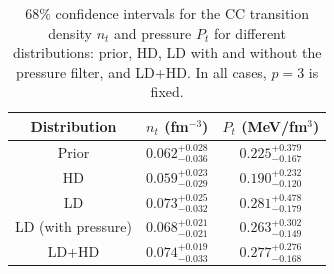 \begin{table}[!t]
\begin{center}
\begin{tabular}{ccc} 
  \toprule
  \toprule
  Distribution & $n_t$ (fm$^{-3}$) & $P_t$ (MeV/fm$^3$)\\
  \midrule
  Prior              & $0.062_{-0.036}^{+0.028}$ &
  $0.225_{-0.167}^{+0.379}$ \\
  HD                 & $0.059_{-0.029}^{+0.023}$ &
  $0.190_{-0.120}^{+0.232}$ \\ 
  LD                 & $0.073_{-0.032}^{+0.025}$ &
  $0.281_{-0.179}^{+0.478}$ \\ 
  LD (with pressure) & $0.068_{-0.021}^{+0.021}$ & 
  $0.263_{-0.149}^{+0.302}$ \\ 
  LD+HD              & $0.074_{-0.033}^{+0.019}$ & 
  $0.277_{-0.168}^{+0.276}$ \\ 
  \bottomrule
  \bottomrule
\end{tabular}
\end{center}
\caption[$68\%$ confidence intervals for the crust-core transition density and
pressure for different filters]{$68\%$ confidence intervals for the CC
transition density $n_t$ and pressure $P_t$ for different distributions: prior, 
HD, LD with and without the pressure filter, and LD+HD. In all cases, $p=3$ is
fixed.}\label{table:ntpt}
\end{table}

